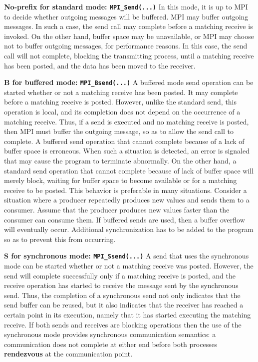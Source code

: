 \documentclass[11pt]{article}
\begin{document}
\textbf{No-prefix for standard mode: \texttt{MPI\_Send(...)}}
In this mode, it is up to MPI to decide whether outgoing messages will be buffered. 
MPI may buffer outgoing messages. 
In such a case, the send call may complete before a matching receive is invoked. 
On the other hand, buffer space may be unavailable, or MPI may choose not to buffer outgoing messages, for performance reasons. 
In this case, the send call will not complete, blocking the transmitting process, until a matching receive has been posted, and the data has been moved to the receiver.

\textbf{B for buffered mode: \texttt{MPI\_Bsend(...)}} 
A buffered mode send operation can be started whether or not a matching receive has been posted. 
It may complete before a matching receive is posted. 
However, unlike the standard send, this operation is local, and its completion does not depend on the occurrence of a matching receive. 
Thus, if a send is executed and no matching receive is posted, then MPI must buffer the outgoing message, so as to allow the send call to complete. 
A buffered send operation that cannot complete because of a lack of buffer space is erroneous. 
When such a situation is detected, an error is signaled that may cause the program to terminate abnormally. 
On the other hand, a standard send operation that cannot complete because of lack of buffer space will merely block, 
waiting for buffer space to become available or for a matching receive to be posted. 
This behavior is preferable in many situations. 
Consider a situation where a producer repeatedly produces new values and sends them to a consumer. 
Assume that the producer produces new values faster than the consumer can consume them. 
If buffered sends are used, then a buffer overflow will eventually occur. 
Additional synchronization has to be added to the program so as to prevent this from occurring. 

\textbf{S for synchronous mode: \texttt{MPI\_Ssend(...)}}
A send that uses the synchronous mode can be started whether or not a matching receive was posted. 
However, the send will complete successfully only if a matching receive is posted, and the receive operation has started to receive the message sent by the synchronous send.
Thus, the completion of a synchronous send not only indicates that the send buffer can be reused, 
but it also indicates that the receiver has reached a certain point in its execution, 
namely that it has started executing the matching receive. 
If both sends and receives are blocking operations then the use of the synchronous mode provides synchronous communication semantics: 
a communication does not complete at either end before both processes \textbf{rendezvous} at the communication point.
\end{document}
